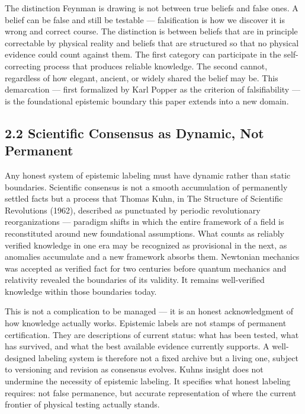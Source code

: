 \documentclass[
]{article}
\begin{document}
The distinction Feynman is drawing is not between true beliefs and false
ones. A belief can be false and still be testable --- falsification is
how we discover it is wrong and correct course. The distinction is
between beliefs that are in principle correctable by physical reality
and beliefs that are structured so that no physical evidence could count
against them. The first category can participate in the self-correcting
process that produces reliable knowledge. The second cannot, regardless
of how elegant, ancient, or widely shared the belief may be. This
demarcation --- first formalized by Karl Popper as the criterion of
falsifiability --- is the foundational epistemic boundary this paper
extends into a new domain.

\subsection{2.2 Scientific Consensus as Dynamic, Not
Permanent}\label{scientific-consensus-as-dynamic-not-permanent}

Any honest system of epistemic labeling must have dynamic rather than
static boundaries. Scientific consensus is not a smooth accumulation of
permanently settled facts but a process that Thomas Kuhn, in The
Structure of Scientific Revolutions (1962), described as punctuated by
periodic revolutionary reorganizations --- paradigm shifts in which the
entire framework of a field is reconstituted around new foundational
assumptions. What counts as reliably verified knowledge in one era may
be recognized as provisional in the next, as anomalies accumulate and a
new framework absorbs them. Newtonian mechanics was accepted as verified
fact for two centuries before quantum mechanics and relativity revealed
the boundaries of its validity. It remains well-verified knowledge
within those boundaries today.

This is not a complication to be managed --- it is an honest
acknowledgment of how knowledge actually works. Epistemic labels are not
stamps of permanent certification. They are descriptions of current
status: what has been tested, what has survived, and what the best
available evidence currently supports. A well-designed labeling system
is therefore not a fixed archive but a living one, subject to versioning
and revision as consensus evolves. Kuhn\textquotesingle s insight does
not undermine the necessity of epistemic labeling. It specifies what
honest labeling requires: not false permanence, but accurate
representation of where the current frontier of physical testing
actually stands.
\end{document}
